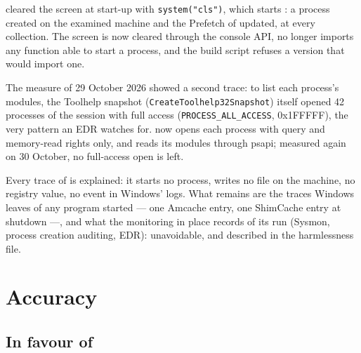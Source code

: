 \documentclass[11pt,a4paper,oneside]{report}
\begin{document}
\wac{} cleared the screen at start-up with \texttt{system("cls")}, which
starts : a process created on the examined machine and the
Prefetch of  updated, at every collection. The screen is now
cleared through the console API, \wac{} no longer imports any function able to
start a process, and the build script refuses a version that would import one.

The measure of 29 October 2026 showed a second trace: to list each process's
modules, the Toolhelp snapshot (\texttt{CreateToolhelp32Snapshot}) itself
opened 42 processes of the session with full access
(\texttt{PROCESS\_ALL\_ACCESS}, 0x1FFFFF), the very pattern an EDR watches
for. \wac{} now opens each process with query and memory-read rights only, and
reads its modules through psapi; measured again on 30 October, no full-access
open is left.

\begin{note}
Every trace of \wac{} is explained: it starts no process, writes no file on
the machine, no registry value, no event in Windows' logs. What remains are
the traces Windows leaves of any program started --- one Amcache entry, one
ShimCache entry at shutdown ---, and what the monitoring in place records of
its run (Sysmon, process creation auditing, EDR): unavoidable, and described in
the harmlessness file.
\end{note}

\chapter{Accuracy}\label{chap:precision}

\section{In favour of \wac{}}
\end{document}

